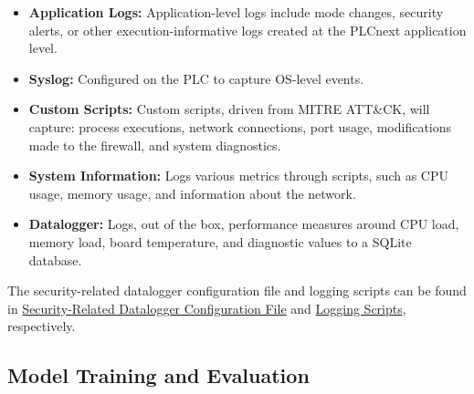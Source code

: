 \documentclass[Master,BMR,english]{twbook}
\begin{document}
\begin{itemize}
    \item \textbf{Application Logs:} Application-level logs include mode changes, security alerts, or other execution-informative logs created at the PLCnext application level. 
    \item \textbf{Syslog:} Configured on the PLC to capture OS-level events. 
    \item \textbf{Custom Scripts:} Custom scripts, driven from MITRE ATT\&CK, will capture: process executions, network connections, port usage, modifications made to the firewall, and system diagnostics.
    \item \textbf{System Information:} Logs various metrics through scripts, such as CPU usage, memory usage, and information about the network.
    \item \textbf{Datalogger:} Logs, out of the box, performance measures around CPU load, memory load, board temperature, and diagnostic values to a SQLite database. 

\end{itemize}
The security-related datalogger configuration file and logging scripts can be found in \hyperref[sec:security_datalogger]{Security-Related Datalogger Configuration File} and \hyperref[sec:logging_scripts]{Logging Scripts}, respectively.


\subsection{Model Training and Evaluation}
\end{document}
